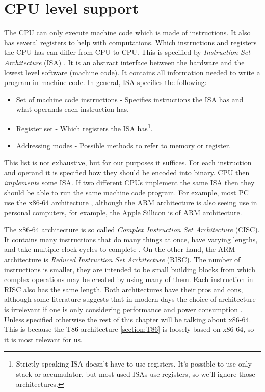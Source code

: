 \section{CPU level support}\label{section:cpu-debug-support}
The CPU can only execute machine code which is made of instructions. It also
has several registers to help with computations. Which instructions and
registers the CPU has can differ from CPU to CPU. This is specified by
\textit{Instruction Set Architecture} (ISA) \cite{aps-isa}. It is an abstract
interface between the hardware and the lowest level software (machine code). It
contains all information needed to write a program in machine code. In general,
ISA specifies the following: 
\begin{itemize}
    \item Set of machine code instructions - Specifies instructions the ISA has
        and what operands each instruction has.
    \item Register set - Which registers the ISA has\footnote{Strictly speaking
        ISA doesn't have to use registers. It's possible to use only stack or
        accumulator, but most used ISAs use registers, so we'll ignore those
        architectures. }.   
    \item Addressing modes - Possible methods to refer to memory or register. 
\end{itemize}
This list is not exhaustive, but for our purposes it suffices. For each
instruction and operand it is specified how they should be encoded into binary.
CPU then \textit{implements} some ISA. If two different CPUs implement the same
ISA then they should be able to run the same machine code program. For example,
most PC use the x86-64 architecture \cite{aps-isa}, although the ARM
architecture is also seeing use in personal computers, for example, the Apple
Sillicon is of ARM architecture.

The x86-64 architecture is so called \textit{Complex Instruction Set Architecture}
(CISC). It contains many instructions that do many things at once, have varying
lengths, and take multiple clock cycles to complete \cite{intel-manual}. On the
other hand, the ARM architecture is \textit{Reduced Instruction Set
Architecture} (RISC). The number of instructions is smaller, they are intended
to be small building blocks from which complex operations may be created by
using many of them. Each instruction in RISC also has the same length. Both
architectures have their pros and cons, although some literature suggests that
in modern days the choice of architecture is irrelevant if one is only
considering performance and power consumption \cite{riscvscisc1, riscvscisc2}.
Unless specified otherwise the rest of this chapter will be talking about x86-64.
This is because the T86 architecture \ref{section:T86} is loosely based on
x86-64, so it is most relevant for us.

